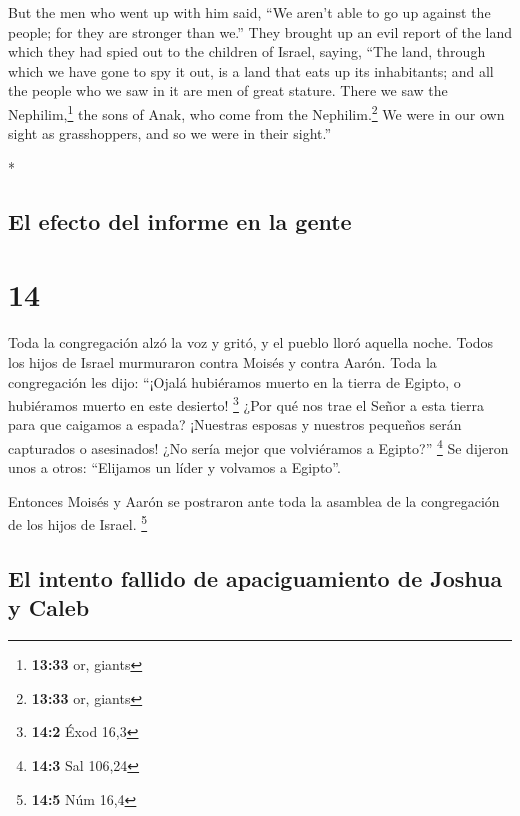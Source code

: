 \begin{paracol}{2}
\begin{otherlanguage}{english}
 But the men who went up with him said, ``We aren't able
to go up against the people; for they are stronger than we.''
 They brought up an evil report of the land which they
had spied out to the children of Israel, saying, ``The land, through
which we have gone to spy it out, is a land that eats up its
inhabitants; and all the people who we saw in it are men of great
stature.  There we saw the Nephilim,\footnote{\textbf{13:33}
  or, giants} the sons of Anak, who come from the Nephilim.\footnote{\textbf{13:33}
  or, giants} We were in our own sight as grasshoppers, and so we were
in their sight.''

\end{otherlanguage}

\switchcolumn[0]*

\hypertarget{el-efecto-del-informe-en-la-gente}{%
\subsection{El efecto del informe en la
gente}\label{el-efecto-del-informe-en-la-gente}}

\hypertarget{section-26}{%
\section{14}\label{section-26}}

 Toda la congregación alzó la voz y gritó, y el pueblo
lloró aquella noche.  Todos los hijos de Israel murmuraron
contra Moisés y contra Aarón. Toda la congregación les dijo: ``¡Ojalá
hubiéramos muerto en la tierra de Egipto, o hubiéramos muerto en este
desierto! \footnote{\textbf{14:2} Éxod 16,3}  ¿Por qué nos
trae el Señor a esta tierra para que caigamos a espada? ¡Nuestras
esposas y nuestros pequeños serán capturados o asesinados! ¿No sería
mejor que volviéramos a Egipto?'' \footnote{\textbf{14:3} Sal 106,24}
 Se dijeron unos a otros: ``Elijamos un líder y volvamos a
Egipto''.

 Entonces Moisés y Aarón se postraron ante toda la
asamblea de la congregación de los hijos de Israel. \footnote{\textbf{14:5}
  Núm 16,4}

\hypertarget{el-intento-fallido-de-apaciguamiento-de-joshua-y-caleb}{%
\subsection{El intento fallido de apaciguamiento de Joshua y
Caleb}\label{el-intento-fallido-de-apaciguamiento-de-joshua-y-caleb}}


\end{paracol}
